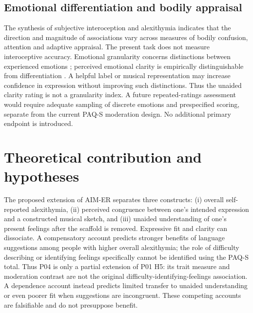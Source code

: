\documentclass[11pt,a4paper]{article}
\begin{document}
\subsection{Emotional differentiation and bodily appraisal}
The synthesis of subjective interoception and alexithymia \citep{vanbael2024} indicates that the direction and magnitude of associations vary across measures of bodily confusion, attention and adaptive appraisal. The present task does not measure interoceptive accuracy. Emotional granularity concerns distinctions between experienced emotions \citep{kashdan2015}; perceived emotional clarity is empirically distinguishable from differentiation \citep{boden2013}. A helpful label or musical representation may increase confidence in expression without improving such distinctions. Thus the unaided clarity rating is not a granularity index. A future repeated-ratings assessment would require adequate sampling of discrete emotions and prespecified scoring, separate from the current PAQ-S moderation design. No additional primary endpoint is introduced.

\section{Theoretical contribution and hypotheses}
The proposed extension of AIM-ER separates three constructs: (i) overall self-reported alexithymia, (ii) perceived congruence between one's intended expression and a constructed musical sketch, and (iii) unaided understanding of one's present feelings after the scaffold is removed. Expressive fit and clarity can dissociate. A compensatory account predicts stronger benefits of language suggestions among people with higher overall alexithymia; the role of difficulty describing or identifying feelings specifically cannot be identified using the PAQ-S total. Thus P04 is only a partial extension of P01 H5: its trait measure and moderation contrast are not the original difficulty-identifying-feelings association. A dependence account instead predicts limited transfer to unaided understanding or even poorer fit when suggestions are incongruent. These competing accounts are falsifiable and do not presuppose benefit.
\end{document}
